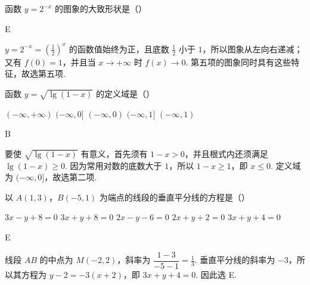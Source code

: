 \documentclass[UTF8,a4paper,oneside,11pt]{ctexbook}
\begin{document}
\begin{problem}

函数 \(y = 2^{-x} \) 的图象的大致形状是（\quad）

\choicesfive
    {}
    {}
    {}
    {}
    {}
\begin{answer}
E
\end{answer}

\begin{solution}
\(y=2^{-x}=\left(\frac12\right)^x\) 的函数值始终为正，且底数 \(\frac12\) 小于 \(1\)，所以图象从左向右递减；又有 \(f(0)=1\)，并且当 \(x\to+\infty\) 时 \(f(x)\to0\). 第五项的图象同时具有这些特征，故选第五项.
\end{solution}
\end{problem}

\begin{problem}

函数 \(y = \sqrt{\lg(1 - x)} \) 的定义域是（\quad）

\choicesfive
    {\((-\infty,+\infty) \)}
    {\((-\infty, 0] \)}
    {\((-\infty, 0) \)}
    {\((-\infty, 1] \)}
    {\((-\infty, 1) \)}
\begin{answer}
B
\end{answer}

\begin{solution}
要使 \(\sqrt{\lg(1-x)}\) 有意义，首先须有 \(1-x>0\)，并且根式内还须满足 \(\lg(1-x)\geqslant0\). 因为常用对数的底数大于 \(1\)，所以 \(1-x\geqslant1\)，即 \(x\leqslant0\). 定义域为 \((-\infty,0]\)，故选第二项.
\end{solution}
\end{problem}

\begin{problem}

以 \(A(1, 3)\)，\(B(-5, 1)\) 为端点的线段的垂直平分线的方程是（\quad）

\choicesfive
    {\(3x - y + 8 = 0\)}
    {\(3x + y + 8 = 0\)}
    {\(2x - y - 6 = 0\)}
    {\(2x + y + 2 = 0\)}
    {\(3x + y + 4 = 0\)}
\begin{answer}
E
\end{answer}

\begin{solution}
线段 \(AB\) 的中点为 \(M\left(-2,2\right)\)，斜率为 \(\dfrac{1-3}{-5-1}=\frac13\). 垂直平分线的斜率为 \(-3\)，所以其方程为
\(y-2=-3(x+2)\)，即 \(3x+y+4=0\). 因此选 E.
\end{solution}
\end{problem}
\end{document}
